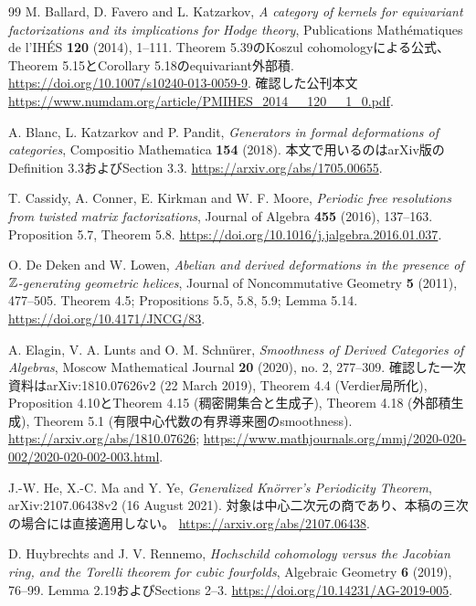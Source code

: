 \begin{thebibliography}{99}
M. Ballard, D. Favero and L. Katzarkov,
\emph{A category of kernels for equivariant factorizations and its implications for Hodge theory},
Publications Mathématiques de l'IHÉS \textbf{120} (2014), 1--111.
Theorem 5.39のKoszul cohomologyによる公式、Theorem 5.15とCorollary 5.18のequivariant外部積.
\url{https://doi.org/10.1007/s10240-013-0059-9}.
確認した公刊本文 \url{https://www.numdam.org/article/PMIHES_2014__120__1_0.pdf}.

A. Blanc, L. Katzarkov and P. Pandit,
\emph{Generators in formal deformations of categories},
Compositio Mathematica \textbf{154} (2018).
本文で用いるのはarXiv版のDefinition 3.3およびSection 3.3.
\url{https://arxiv.org/abs/1705.00655}.

T. Cassidy, A. Conner, E. Kirkman and W. F. Moore,
\emph{Periodic free resolutions from twisted matrix factorizations},
Journal of Algebra \textbf{455} (2016), 137--163.
Proposition 5.7, Theorem 5.8.
\url{https://doi.org/10.1016/j.jalgebra.2016.01.037}.

O. De Deken and W. Lowen,
\emph{Abelian and derived deformations in the presence of \(\mathbb Z\)-generating geometric helices},
Journal of Noncommutative Geometry \textbf{5} (2011), 477--505.
Theorem 4.5; Propositions 5.5, 5.8, 5.9; Lemma 5.14.
\url{https://doi.org/10.4171/JNCG/83}.

A. Elagin, V. A. Lunts and O. M. Schn\"urer,
\emph{Smoothness of Derived Categories of Algebras},
Moscow Mathematical Journal \textbf{20} (2020), no. 2, 277--309.
確認した一次資料はarXiv:1810.07626v2 (22 March 2019),
Theorem 4.4 (Verdier局所化), Proposition 4.10とTheorem 4.15 (稠密開集合と生成子),
Theorem 4.18 (外部積生成), Theorem 5.1 (有限中心代数の有界導来圏のsmoothness).
\url{https://arxiv.org/abs/1810.07626};
\url{https://www.mathjournals.org/mmj/2020-020-002/2020-020-002-003.html}.

J.-W. He, X.-C. Ma and Y. Ye, \emph{Generalized Kn\"orrer's Periodicity Theorem},
arXiv:2107.06438v2 (16 August 2021).
対象は中心二次元の商であり、本稿の三次の場合には直接適用しない。
\url{https://arxiv.org/abs/2107.06438}.

D. Huybrechts and J. V. Rennemo,
\emph{Hochschild cohomology versus the Jacobian ring, and the Torelli theorem for cubic fourfolds},
Algebraic Geometry \textbf{6} (2019), 76--99.
Lemma 2.19およびSections 2--3.
\url{https://doi.org/10.14231/AG-2019-005}.


\end{thebibliography}
